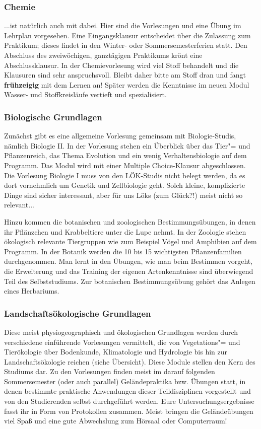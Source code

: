 \subsubsection*{Chemie}
...ist natürlich auch mit dabei. Hier sind die Vorlesungen und eine Übung im Lehrplan vorgesehen. Eine Eingangsklausur entscheidet über die Zulassung zum Praktikum; dieses ﬁndet in den Winter- oder Sommersemesterferien statt. Den Abschluss des zweiwöchigen, ganztägigen Praktikums krönt eine Abschlussklausur. In der Chemievorlesung wird viel Stoff behandelt und die Klausuren sind sehr anspruchsvoll. Bleibt daher bitte am Stoff dran und fangt \textbf{frühzeigig} mit dem Lernen an! Später werden die Kenntnisse im neuen Modul Wasser- und Stoffkreisläufe vertieft und spezialisiert.

\subsubsection{Biologische Grundlagen}
Zunächst gibt es eine allgemeine Vorlesung gemeinsam mit Biologie-Studis, nämlich Biologie II. In der Vorlesung stehen ein Überblick über das Tier"= und Pflanzenreich, das Thema Evolution und ein wenig Verhaltensbiologie auf dem Programm. Das Modul wird mit einer Multiple Choice-Klausur abgeschlossen. Die Vorlesung Biologie I muss von den LÖK-Studis nicht belegt werden, da es dort vornehmlich um Genetik und Zellbiologie geht. Solch kleine, komplizierte Dinge sind sicher interessant, aber für uns Löks (zum Glück?!) meist nicht so relevant...

Hinzu kommen die botanischen und zoologischen Bestimmungsübungen, in denen ihr Pflänzchen und Krabbeltiere unter die Lupe nehmt. In der Zoologie stehen ökologisch relevante Tiergruppen wie zum Beispiel Vögel und Amphibien auf dem Programm. In der Botanik werden die 10 bis 15 wichtigsten Pflanzenfamilien durchgenommen. Man lernt in den Übungen, wie man beim Bestimmen vorgeht, die Erweiterung und das Training der eigenen Artenkenntnisse sind überwiegend Teil des Selbststudiums. Zur botanischen Bestimmungsübung gehört das Anlegen eines Herbariums.

\subsubsection*{Landschaftsökologische Grundlagen}
Diese meist physiogeographisch und ökologischen Grundlagen werden durch verschiedene einführende Vorlesungen vermittelt, die von Vegetations"= und Tierökologie über Bodenkunde, Klimatologie und Hydrologie bis hin zur Landschaftsökologie reichen (siehe Übersicht). Diese Module stellen den Kern des Studiums dar. Zu den Vorlesungen ﬁnden meist im darauf folgenden Sommersemester (oder auch parallel) Geländepraktika bzw. Übungen statt, in denen bestimmte praktische Anwendungen dieser Teildisziplinen vorgestellt und von den Studierenden selbst durchgeführt werden. Eure Untersuchungsergebnisse fasst ihr in Form von Protokollen zusammen. Meist bringen die Geländeübungen viel Spaß und eine gute Abwechslung zum Hörsaal oder Computerraum!

